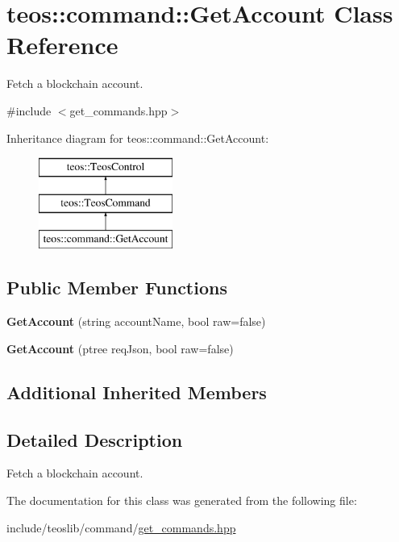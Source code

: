 \hypertarget{classteos_1_1command_1_1_get_account}{}\section{teos\+:\+:command\+:\+:Get\+Account Class Reference}
\label{classteos_1_1command_1_1_get_account}


Fetch a blockchain account.  




{\ttfamily \#include $<$get\+\_\+commands.\+hpp$>$}

Inheritance diagram for teos\+:\+:command\+:\+:Get\+Account\+:\begin{figure}[H]
\begin{center}
\leavevmode
\includegraphics[height=3.000000cm]{classteos_1_1command_1_1_get_account}
\end{center}
\end{figure}
\subsection*{Public Member Functions}
\begin{DoxyCompactItemize}
\item 
\mbox{\label{classteos_1_1command_1_1_get_account_a0e9c495d0f86bda5a8c873a57ce12102}} 
{\bfseries Get\+Account} (string account\+Name, bool raw=false)
\item 
\mbox{\label{classteos_1_1command_1_1_get_account_a57e08f7a17e9d02a886cea53bcce0ce7}} 
{\bfseries Get\+Account} (ptree req\+Json, bool raw=false)
\end{DoxyCompactItemize}
\subsection*{Additional Inherited Members}


\subsection{Detailed Description}
Fetch a blockchain account. 

The documentation for this class was generated from the following file\+:\begin{DoxyCompactItemize}
\item 
include/teoslib/command/\mbox{\hyperlink{get__commands_8hpp}{get\+\_\+commands.\+hpp}}\end{DoxyCompactItemize}
